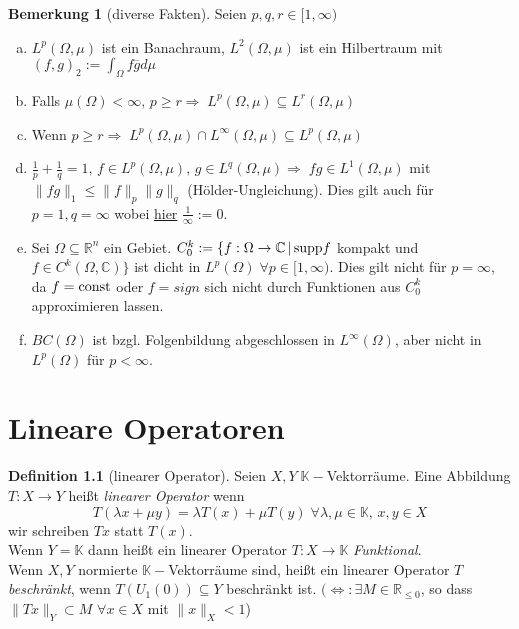 \documentclass[ngerman]{report}
\theoremstyle{definition}%
\newtheorem{definition}[section]{Definition}
\theoremstyle{myStyle}
\newtheorem{bem}[section]{Bemerkung}
\theoremstyle{plain}%
\newcommand{\C}{\mathbb{C}}
\newcommand{\R}{\mathbb{R}}
\newcommand{\pR}{\mathbb{R}_{\leq 0}} %
\newcommand{\K}{\mathbb{K}}
\newcommand{\supp}{\textnormal{supp}}
\newcommand{\norm}[1]{\|#1\|}
\begin{document}
\begin{bem}[diverse Fakten]
	Seien $p,q,r\in [1,\infty)$
	\begin{enumerate}[(a)]
		\item $L^p(\Omega,\mu)$ ist ein Banachraum, $L^2(\Omega,\mu)$ ist ein Hilbertraum mit $(f,g)_2 := \int_\Omega f \overline{g} d\mu$
		
		\item Falls $\mu(\Omega) < \infty,\, p\geq r \Rightarrow\; L^p(\Omega,\mu)\subseteq L^r(\Omega,\mu)$
		
		\item Wenn $p\geq r\Rightarrow\; L^p(\Omega,\mu)\cap L^\infty(\Omega,\mu)\subseteq L^p(\Omega,\mu)$
		
		\item $\frac{1}{p}+\frac{1}{q}=1,\,f\in L^p(\Omega,\mu),\,g\in L^q(\Omega,\mu)\Rightarrow\;fg\in 		 L^1(\Omega,\mu)$ mit $\norm{fg}_1\leq\norm{f}_p\norm{g}_q$ (Hölder-Ungleichung). Dies gilt auch für $p=1, q=\infty$ wobei \underline{hier} $\frac{1}{\infty}:=0$.
		
		\item Sei $\Omega\subseteq \R^n$ ein Gebiet. $C^k_0:=\{f:\Omega \rightarrow \C\,|\, \supp f$ kompakt und $f\in C^k(\Omega,\C)\}$ ist dicht in $L^p(\Omega)\;\forall p\in[1,\infty)$. Dies gilt nicht für $p=\infty$, da $f=\textnormal{const}$ oder $f=sign$ sich nicht durch Funktionen aus $C^k_0$ approximieren lassen.
		
		\item $BC(\Omega)$ ist bzgl. Folgenbildung abgeschlossen in $L^\infty (\Omega)$, aber nicht in $L^p(\Omega)$ für $p<\infty$.
	\end{enumerate}
\end{bem}



\chapter{Lineare Operatoren}%

	\begin{definition}[linearer Operator]
		Seien $X,Y\; \K-$Vektorräume. Eine Abbildung $T:X\rightarrow Y$ heißt \textit{linearer Operator} wenn 
		$$T(\lambda x+\mu y) = \lambda T(x) + \mu T(y)\;\forall \lambda,\mu \in \K,\,x,y\in X$$ 
		wir schreiben $Tx$ statt $T(x)$.\\
		Wenn $Y=\K$ dann heißt ein linearer Operator $T:X\rightarrow \K$\textit{ Funktional}.\\
		Wenn $X,Y$ normierte $\K-$Vektorräume sind, heißt ein linearer Operator $T$ \textit{beschränkt}, wenn $T(U_1(0)) \subseteq Y$ beschränkt ist. 
		$(\Leftrightarrow: \exists M \in \pR$, so dass $\norm{Tx}_Y \subset M$ $\forall x\in X$ mit $\norm{x}_X < 1$)
	\end{definition}
\end{document}
